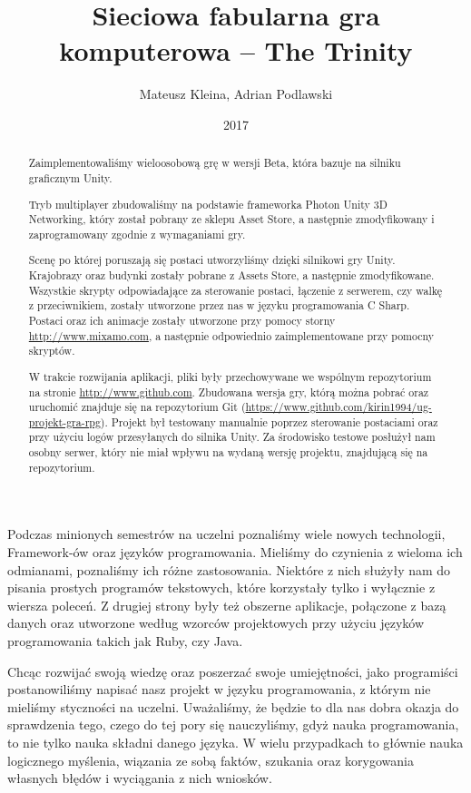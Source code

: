 \documentclass[openright]{xmgr}
\author   {Mateusz Kleina, Adrian Podlawski}
\title    {Sieciowa fabularna gra komputerowa -- The Trinity}
\date     {2017}
\begin{document}
\begin{abstract}
  Zaimplementowaliśmy wieloosobową grę w wersji Beta, która bazuje na silniku graficznym Unity.
  
  Tryb multiplayer zbudowaliśmy na podstawie frameworka Photon Unity 3D Networking, który został pobrany ze sklepu Asset Store, a następnie zmodyfikowany i zaprogramowany zgodnie z wymaganiami gry.

  Scenę po której poruszają się postaci utworzyliśmy dzięki silnikowi gry Unity.
  Krajobrazy oraz budynki zostały pobrane z Assets Store, a następnie zmodyfikowane.
  Wszystkie skrypty odpowiadające za sterowanie postaci, łączenie z serwerem, czy walkę z przeciwnikiem, zostały utworzone przez nas w języku programowania C Sharp.
  Postaci oraz ich animacje zostały utworzone przy pomocy storny \url{http://www.mixamo.com}, a następnie odpowiednio zaimplementowane przy pomocny skryptów.

  W trakcie rozwijania aplikacji, pliki były przechowywane we wspólnym repozytorium na stronie \url{http://www.github.com}. Zbudowana wersja gry, którą można pobrać oraz uruchomić znajduje się na repozytorium Git (\url{https://www.github.com/kirin1994/ug-projekt-gra-rpg}).
  Projekt był testowany manualnie poprzez sterowanie postaciami oraz przy użyciu logów przesyłanych do silnika Unity.
  Za środowisko testowe posłużył nam osobny serwer, który nie miał wpływu na wydaną wersję projektu, znajdującą się na repozytorium.
\end{abstract}


\maketitle

\introduction

  Podczas minionych semestrów na uczelni poznaliśmy wiele nowych technologii, Framework-ów oraz języków programowania. Mieliśmy do czynienia z wieloma ich odmianami, poznaliśmy ich różne zastosowania. Niektóre z nich służyły nam do pisania prostych programów tekstowych, które korzystały tylko i wyłącznie z wiersza poleceń. Z drugiej strony były też obszerne aplikacje, połączone z bazą danych oraz utworzone według wzorców projektowych przy użyciu  języków programowania takich jak Ruby, czy Java. 

  Chcąc rozwijać swoją wiedzę oraz poszerzać swoje umiejętności, jako programiści postanowiliśmy napisać nasz projekt w języku programowania, z którym nie mieliśmy styczności na uczelni. Uważaliśmy, że będzie to dla nas dobra okazja do sprawdzenia tego, czego do tej pory się nauczyliśmy, gdyż nauka programowania, to nie tylko nauka składni danego języka. W wielu przypadkach to głównie nauka logicznego myślenia, wiązania ze sobą faktów, szukania oraz korygowania własnych błędów i wyciągania z nich wniosków. 
\end{document}
